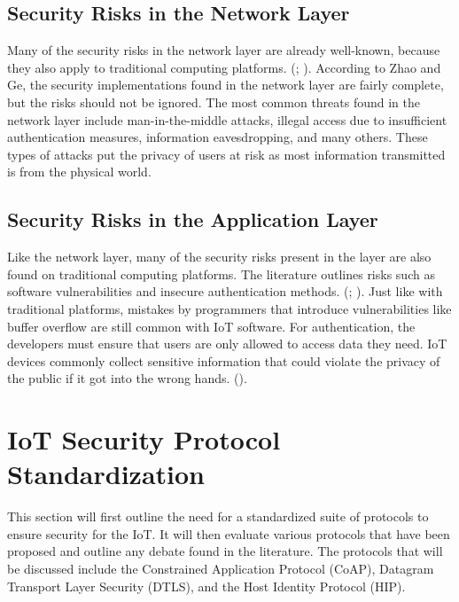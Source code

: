 \documentclass[letterpaper, 12pt]{article}
\begin{document}
\begin{flushleft}
\subsection*{Security Risks in the Network Layer}
Many of the security risks in the network layer are already well-known, because they also apply to traditional computing platforms. 
(\cite{Zhao6746513}; \cite{Xiaohui6643029}). According to Zhao and Ge, the security implementations found in the network layer are fairly complete, but
the risks should not be ignored. The most common threats found in the network layer include man-in-the-middle attacks, illegal access due to 
insufficient authentication measures, information eavesdropping, and many others. These types of attacks put the privacy of users at risk as most
information transmitted is from the physical world. 

\subsection*{Security Risks in the Application Layer}
Like the network layer, many of the security risks present in the layer are also found on traditional computing platforms. The literature outlines
risks such as software vulnerabilities and insecure authentication methods. (\cite{Zhao6746513}; \cite{Suo6188257}). Just like with traditional
platforms, mistakes by programmers that introduce vulnerabilities like buffer overflow are still common with IoT software. For authentication,
the developers must ensure that users are only allowed to access data they need. IoT devices commonly collect sensitive information that could
violate the privacy of the public if it got into the wrong hands. (\cite{Zhang:2015:EST:2714576.2737091}). 

\section*{IoT Security Protocol Standardization}

This section will first outline the need for a standardized suite of protocols to ensure security for the IoT. It will then evaluate various protocols
that have been proposed and outline any debate found in the literature. The protocols that will be discussed include the Constrained Application
Protocol (CoAP), Datagram Transport Layer Security (DTLS), and the Host Identity Protocol (HIP). 


\end{flushleft}
\end{document}

